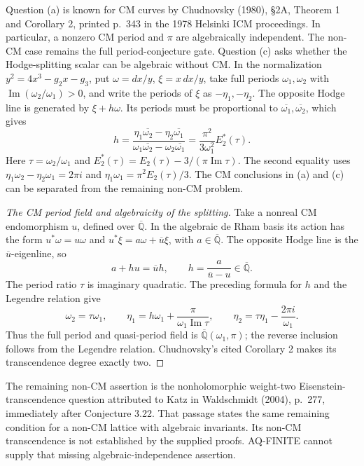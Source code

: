 Question (a) is known for CM curves by Chudnovsky (1980),
\S2A, Theorem 1 and Corollary 2, printed p.~343
in the 1978 Helsinki ICM proceedings. In particular,
a nonzero CM period and $\pi$ are algebraically
independent. The non-CM case remains the full
period-conjecture gate. Question (c) asks whether the
Hodge-splitting scalar can be algebraic without CM.
In the normalization $y^2=4x^3-g_2x-g_3$,
put $\omega=dx/y$, $\xi=x\,dx/y$, take full periods
$\omega_1,\omega_2$ with $\operatorname{Im}
(\omega_2/\omega_1)>0$, and write the periods of
$\xi$ as $-\eta_1,-\eta_2$. The opposite Hodge line
is generated by $\xi+h\omega$. Its periods must be
proportional to $\overline{\omega_1},
\overline{\omega_2}$, which gives
\[
 h=\frac{\eta_1\overline{\omega_2}-\eta_2\overline{\omega_1}}
          {\omega_1\overline{\omega_2}-\omega_2\overline{\omega_1}}
   =\frac{\pi^2}{3\omega_1^2}E_2^*(\tau).
\]
Here $\tau=\omega_2/\omega_1$ and
$E_2^*(\tau)=E_2(\tau)-3/(\pi\operatorname{Im}\tau)$.
The second equality uses
$\eta_1\omega_2-\eta_2\omega_1=2\pi i$ and
$\eta_1\omega_1=\pi^2E_2(\tau)/3$.
The CM conclusions in (a) and (c) can be separated
from the remaining non-CM problem.
\begin{proof}[The CM period field and algebraicity of the splitting]
Take a nonreal CM endomorphism $u$, defined over
$\overline{\mathbb Q}$. In the algebraic de Rham
basis its action has the form
$u^*\omega=u\omega$ and
$u^*\xi=a\omega+\overline u\xi$, with
$a\in\overline{\mathbb Q}$. The opposite Hodge line
is the $\overline u$-eigenline, so
\[
 a+hu=\overline u h,\qquad
 h=\frac{a}{\overline u-u}\in\overline{\mathbb Q}.
\]
The period ratio $\tau$ is imaginary quadratic.
The preceding formula for $h$ and the Legendre
relation give
\[
 \omega_2=\tau\omega_1,\qquad
 \eta_1=h\omega_1+\frac{\pi}{\omega_1\operatorname{Im}\tau},
 \qquad \eta_2=\tau\eta_1-\frac{2\pi i}{\omega_1}.
\]
Thus the full period and quasi-period field is
$\overline{\mathbb Q}(\omega_1,\pi)$; the reverse
inclusion follows from the Legendre relation.
Chudnovsky's cited Corollary 2 makes its
transcendence degree exactly two.
\end{proof}
The remaining non-CM assertion is the nonholomorphic weight-two
Eisenstein-transcendence question attributed to Katz
in Waldschmidt (2004), p.~277, immediately after
Conjecture 3.22. That passage states the same remaining
condition for a non-CM lattice with algebraic invariants.
Its non-CM transcendence is not established by the
supplied proofs. AQ-FINITE cannot supply that missing
algebraic-independence assertion.

